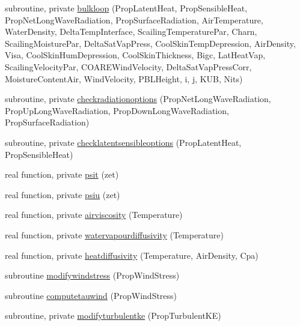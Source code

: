 \begin{DoxyCompactItemize}
\item 
subroutine, private \mbox{\hyperlink{namespacemoduleinterfacewaterair_adca22635eac17186131c131155bfb929}{bulkloop}} (Prop\+Latent\+Heat, Prop\+Sensible\+Heat, Prop\+Net\+Long\+Wave\+Radiation, Prop\+Surface\+Radiation, Air\+Temperature, Water\+Density, Delta\+Temp\+Interface, Scailing\+Temperature\+Par, Charn, Scailing\+Moisture\+Par, Delta\+Sat\+Vap\+Press, Cool\+Skin\+Temp\+Depression, Air\+Density, Visa, Cool\+Skin\+Hum\+Depression, Cool\+Skin\+Thickness, Bigc, Lat\+Heat\+Vap, Scailing\+Velocity\+Par, C\+O\+A\+R\+E\+Wind\+Velocity, Delta\+Sat\+Vap\+Press\+Corr, Moisture\+Content\+Air, Wind\+Velocity, P\+B\+L\+Height, i, j, K\+UB, Nits)
\item 
subroutine, private \mbox{\hyperlink{namespacemoduleinterfacewaterair_a285710ae41f9eb54923e88dfcaf64681}{checkradiationoptions}} (Prop\+Net\+Long\+Wave\+Radiation, Prop\+Up\+Long\+Wave\+Radiation, Prop\+Down\+Long\+Wave\+Radiation, Prop\+Surface\+Radiation)
\item 
subroutine, private \mbox{\hyperlink{namespacemoduleinterfacewaterair_a7ad682cf919390b70351f87d094eb4fb}{checklatentsensibleoptions}} (Prop\+Latent\+Heat, Prop\+Sensible\+Heat)
\item 
real function, private \mbox{\hyperlink{namespacemoduleinterfacewaterair_a65968d6dee9f2e512ec37dd5d4fe8fe1}{psit}} (zet)
\item 
real function, private \mbox{\hyperlink{namespacemoduleinterfacewaterair_af976a3b281048d4f32222b16621b556a}{psiu}} (zet)
\item 
real function, private \mbox{\hyperlink{namespacemoduleinterfacewaterair_adc7a37061f983410896c39bb15a20517}{airviscosity}} (Temperature)
\item 
real function, private \mbox{\hyperlink{namespacemoduleinterfacewaterair_ad635dbe2d03621ece4e4eeb32fc65bb6}{watervapourdiffusivity}} (Temperature)
\item 
real function, private \mbox{\hyperlink{namespacemoduleinterfacewaterair_ab0d1bf1d73b112083b7be11d6c22aebc}{heatdiffusivity}} (Temperature, Air\+Density, Cpa)
\item 
subroutine \mbox{\hyperlink{namespacemoduleinterfacewaterair_a09c4f1b7db1459cc4893f784b8310831}{modifywindstress}} (Prop\+Wind\+Stress)
\item 
subroutine \mbox{\hyperlink{namespacemoduleinterfacewaterair_aa8b103904b5c34125450b64aeff53081}{computetauwind}} (Prop\+Wind\+Stress)
\item 
subroutine, private \mbox{\hyperlink{namespacemoduleinterfacewaterair_ac1f2af410795916d4c7572b0b5a8e963}{modifyturbulentke}} (Prop\+Turbulent\+KE)

\end{DoxyCompactItemize}
